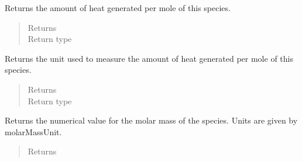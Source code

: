 \documentclass[letterpaper,10pt,openany,oneside,english]{sphinxmanual}
\begin{document}
\begin{fulllineitems}

\begin{fulllineitems}
\label{\detokenize{support_rst/specie:specie.Specie.GetMolarHeatPwr}}
Returns the amount of heat generated per mole of this species.
\begin{quote}\begin{description}
\item[{Returns}] \leavevmode
{}

\item[{Return type}] \leavevmode
{}

\end{description}\end{quote}

\end{fulllineitems}


\begin{fulllineitems}
\label{\detokenize{support_rst/specie:specie.Specie.GetMolarHeatPwrUnit}}
Returns the unit used to measure the amount of heat generated per mole
of this species.
\begin{quote}\begin{description}
\item[{Returns}] \leavevmode
{}

\item[{Return type}] \leavevmode
{}

\end{description}\end{quote}

\end{fulllineitems}


\begin{fulllineitems}
\label{\detokenize{support_rst/specie:specie.Specie.GetMolarMass}}
Returns the numerical value for the molar mass of the species. Units
are given by molarMassUnit.
\begin{quote}\begin{description}
\item[{Returns}] \leavevmode
{}


\end{description}
\end{quote}
\end{fulllineitems}
\end{fulllineitems}
\end{document}

